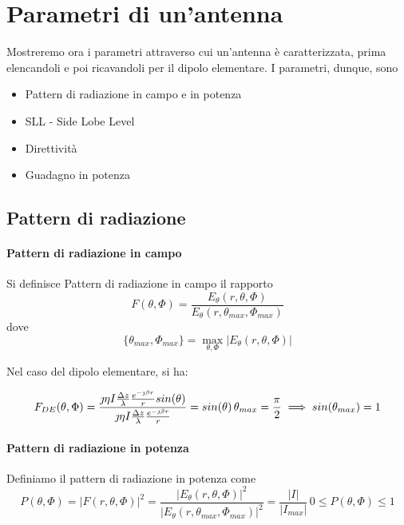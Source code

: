 \section{Parametri di un'antenna}\label{sec:paramAnt}
Mostreremo ora i parametri attraverso cui un'antenna è caratterizzata, prima elencandoli e poi ricavandoli per il dipolo elementare.
I parametri, dunque, sono
\begin{itemize}
  \item Pattern di radiazione in campo e in potenza
  \item SLL - Side Lobe Level
  \item Direttività
  \item Guadagno in potenza
\end{itemize}

\subsection{Pattern di radiazione}
\paragraph{Pattern di radiazione in campo}
Si definisce Pattern di radiazione in campo il rapporto
\begin{equation} \label{eq:patternCampo}
  F(\theta,\Phi) = \frac{E_\theta(r,\theta,\Phi)}{E_\theta(r,\theta_{max},\Phi_{max})}
\end{equation}
dove
\begin{equation}
  \{\theta_{max} , \Phi_{max}\} = \max_{\theta,\Phi} |E_\theta(r,\theta,\Phi)|
\end{equation}

Nel caso del dipolo elementare, si ha:

\begin{equation}
  F_{DE}(\theta,\Phi) = \frac{\jmath\eta I \frac{\Delta z}{\lambda} \frac{e^{-\jmath \beta r}}{r} sin(\theta)}{\jmath\eta I \frac{\Delta z}{\lambda} \frac{e^{-\jmath \beta r}}{r}} = sin(\theta) \, \theta_{max}=\frac{\pi}{2} \implies sin(\theta_{max}) =1
\end{equation}


\paragraph{Pattern di radiazione in potenza}
Definiamo il pattern di radiazione in potenza come
\begin{equation}\label{eq:patternPotenza}
  P(\theta,\Phi) = |F(r,\theta,\Phi)|^2 = \frac{|E_\theta(r,\theta,\Phi)|^2}{|E_\theta(r,\theta_{max},\Phi_{max})|^2} = \frac{|I|}{|I_{max}|} \, 0\le P(\theta,\Phi) \le 1
\end{equation}


